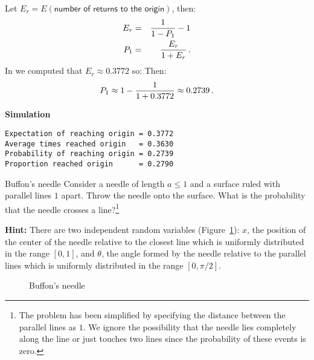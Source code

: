 Let $E_r=E(\textsf{number of returns to the origin})$, then:
\begin{eqnarray*}
E_r &=& \displaystyle\frac{1}{1-P_1} - 1\\
P_1&=& \displaystyle\frac{E_r}{1+E_r}\,.
\end{eqnarray*}
In  we computed that $E_r\approx 0.3772$ so:
Then:
\[
P_1 \approx 1- \displaystyle\frac{1}{1+0.3772}
\approx 0.2739\,.
\]

\textbf{Simulation}
\begin{verbatim}
Expectation of reaching origin = 0.3772
Average times reached origin   = 0.3630
Probability of reaching origin = 0.2739
Proportion reached origin      = 0.2790
\end{verbatim}


\begin{prob}{Buffon's needle}
Consider a needle of length $a\leq 1$ and a surface ruled with parallel lines $1$ apart. Throw the needle onto the surface. What is the probability that the needle crosses a line?\footnote{The problem has been simplified by specifying the distance between the parallel lines as $1$. We ignore the possibility that the needle lies completely along the line or just touches two lines since the probability of these events is zero.}

\textbf{Hint:} There are two independent random variables (Figure~\ref{f.buffon1}): $x$, the position of the center of the needle relative to the closest line which is uniformly distributed in the range $[0,1]$, and $\theta$, the angle formed by the needle relative to the parallel lines which is uniformly distributed in the range $[0,\pi/2]$.

\begin{figure}[tb]
\begin{center}
\end{center}
\caption{Buffon's needle}\label{f.buffon1}
\end{figure}

\end{prob}

